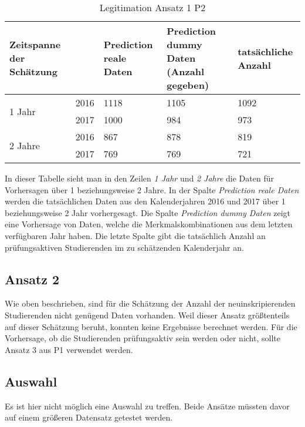 \begin{table}[ht]
  \caption{\label{tab:legitimationA1P2} Legitimation Ansatz 1 P2}
  \begin{tabular}{ p{2.5cm} p{1cm} p{3cm} p{3cm} p{3cm} }
    \toprule
    Zeitspanne der Sch\"atzung &      & Prediction reale Daten & Prediction dummy Daten (Anzahl gegeben) & tats\"achliche Anzahl \\
    \midrule
    \multirow{2}{3em}{1 Jahr}
                               & 2016 & 1118                   & 1105                                    & 1092                  \\
                               & 2017 & 1000                   & 984                                     & 973                   \\
    \midrule
    \multirow{2}{4em}{2 Jahre}
                               & 2016 & 867                    & 878                                     & 819                   \\
                               & 2017 & 769                    & 769                                     & 721                   \\

    \bottomrule
  \end{tabular}

\end{table}

In dieser Tabelle sieht man in den Zeilen \textit{1 Jahr} und \textit{2 Jahre} die Daten f\"ur Vorhersagen \"uber 1 beziehungsweise 2 Jahre.
In der Spalte \textit{Prediction reale Daten} werden die tats\"achlichen Daten aus den Kalenderjahren 2016 und 2017 \"uber 1 beziehungsweise
2 Jahr vorhergesagt. Die Spalte \textit{Prediction dummy Daten} zeigt eine Vorhersage von Daten, welche die Merkmalskombinationen aus dem letzten
verf\"ugbaren Jahr haben. Die letzte Spalte gibt die tats\"achlich Anzahl an pr\"ufungsaktiven Studierenden im zu sch\"atzenden Kalenderjahr an. \\


\subsection{Ansatz 2}
Wie oben beschrieben, sind f\"ur die Sch\"atzung der Anzahl der neuinskripierenden Studierenden nicht gen\"ugend Daten vorhanden.
Weil dieser Ansatz gr\"o{\ss}tenteils auf dieser Sch\"atzung beruht, konnten keine Ergebnisse berechnet werden. F\"ur die Vorhersage,
ob die Studierenden pr\"ufungsaktiv sein werden oder nicht, sollte Ansatz 3 aus P1 verwendet werden.

\subsection{Auswahl}
Es ist hier nicht m\"oglich eine Auswahl zu treffen. Beide Ans\"atze m\"ussten davor auf einem gr\"o{\ss}eren Datensatz getestet werden.
